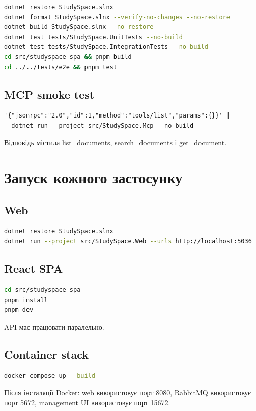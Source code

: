 \documentclass[12pt,a4paper]{article}
\begin{document}
\begin{lstlisting}[language=bash,caption={Основні команди перевірки}]
dotnet restore StudySpace.slnx
dotnet format StudySpace.slnx --verify-no-changes --no-restore
dotnet build StudySpace.slnx --no-restore
dotnet test tests/StudySpace.UnitTests --no-build
dotnet test tests/StudySpace.IntegrationTests --no-build
cd src/studyspace-spa && pnpm build
cd ../../tests/e2e && pnpm test
\end{lstlisting}

\subsection{MCP smoke test}
\begin{lstlisting}[language={},caption={PowerShell tools/list}]
'{"jsonrpc":"2.0","id":1,"method":"tools/list","params":{}}' |
  dotnet run --project src/StudySpace.Mcp --no-build
\end{lstlisting}
Відповідь містила list\_documents, search\_documents і get\_document.

\section{Запуск кожного застосунку}
\subsection{Web}
\begin{lstlisting}[language=bash]
dotnet restore StudySpace.slnx
dotnet run --project src/StudySpace.Web --urls http://localhost:5036
\end{lstlisting}

\subsection{React SPA}
\begin{lstlisting}[language=bash]
cd src/studyspace-spa
pnpm install
pnpm dev
\end{lstlisting}
API має працювати паралельно.

\subsection{Container stack}
\begin{lstlisting}[language=bash]
docker compose up --build
\end{lstlisting}
Після інсталяції Docker: web використовує порт 8080, RabbitMQ використовує
порт 5672, management UI використовує порт 15672.
\end{document}
